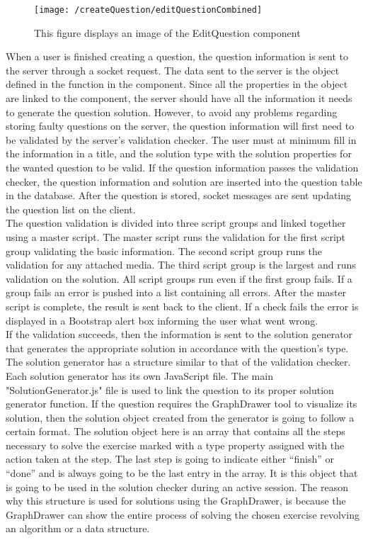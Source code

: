 \begin{figure}[H]
        \texttt{[image: /createQuestion/editQuestionCombined]}
        \caption{This figure displays an image of the EditQuestion component}
        \label{fig:editquestion}
\end{figure}
\noindent
When a user is finished creating a question, the question information is sent to the server through a socket request. The data sent to the server is the  object defined in the function  in the component. Since all the properties in the  object are linked to the component, the server should have all the information it needs to generate the question solution. However, to avoid any problems regarding storing faulty questions on the server, the question information will first need to be validated by the server's validation checker. The user must at minimum fill in the information in a title, and the solution type with the solution properties for the wanted question to be valid. If the question information passes the validation checker, the question information and solution are inserted into the question table in the database. After the question is stored, socket messages are sent updating the question list on the client.
\\[11pt]
The question validation is divided into three script groups and linked together using a master script. The master script runs the validation for the first script group validating the basic information. The second script group runs the validation for any attached media. The third script group is the largest and runs validation on the solution. All script groups run even if the first group fails. If a group fails an error is pushed into a list containing all errors. After the master script is complete, the result is sent back to the client. If a check fails the error is displayed in a Bootstrap alert box informing the user what went wrong.
\\[11pt]
If the validation succeeds, then the information is sent to the solution generator that generates the appropriate solution in accordance with the question's type. The solution generator has a structure similar to that of the validation checker. Each solution generator has its own JavaScript file. The main "SolutionGenerator.js" file is used to link the question to its proper solution generator function. If the question requires the GraphDrawer tool to visualize its solution, then the solution object created from the generator is going to follow a certain format. The solution object here is an array that contains all the steps necessary to solve the exercise marked with a type property assigned with the action taken at the step. The last step is going to indicate either “finish” or “done” and is always going to be the last entry in the array. It is this object that is going to be used in the solution checker during an active session. The reason why this structure is used for solutions using the GraphDrawer, is because the GraphDrawer can show the entire process of solving the chosen exercise revolving an algorithm or a data structure.
